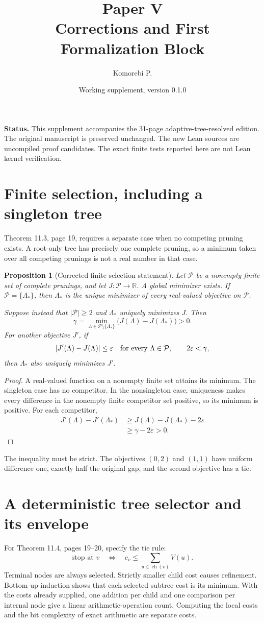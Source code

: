 \documentclass[11pt]{article}
\title{Paper V\\Corrections and First Formalization Block}
\author{Komorebi P.}
\date{Working supplement, version 0.1.0}
\newtheorem{proposition}{Proposition}
\newcommand{\R}{\mathbb R}
\begin{document}
\maketitle
\noindent\textbf{Status.} This supplement accompanies the 31-page adaptive-tree-resolved edition. The original manuscript is preserved unchanged. The new Lean sources are uncompiled proof candidates. The exact finite tests reported here are not Lean kernel verification.

\section{Finite selection, including a singleton tree}
Theorem 11.3, page 19, requires a separate case when no competing pruning exists. A root-only tree has precisely one complete pruning, so a minimum taken over all competing prunings is not a real number in that case.

\begin{proposition}[Corrected finite selection statement]
Let $\mathcal P$ be a nonempty finite set of complete prunings, and let $J:\mathcal P\to\R$. A global minimizer exists. If $\mathcal P=\{\Lambda_*\}$, then $\Lambda_*$ is the unique minimizer of every real-valued objective on $\mathcal P$.

Suppose instead that $|\mathcal P|\ge2$ and $\Lambda_*$ uniquely minimizes $J$. Then
\[
\gamma=\min_{\Lambda\in\mathcal P\setminus\{\Lambda_*\}}
\bigl(J(\Lambda)-J(\Lambda_*)\bigr)>0.
\]
For another objective $J'$, if
\[
|J'(\Lambda)-J(\Lambda)|\le\varepsilon
\quad\hbox{for every }\Lambda\in\mathcal P,
\qquad 2\varepsilon<\gamma,
\]
then $\Lambda_*$ also uniquely minimizes $J'$.
\end{proposition}
\begin{proof}
A real-valued function on a nonempty finite set attains its minimum. The singleton case has no competitor. In the nonsingleton case, uniqueness makes every difference in the nonempty finite competitor set positive, so its minimum is positive. For each competitor,
\begin{align*}
J'(\Lambda)-J'(\Lambda_*)
&\ge J(\Lambda)-J(\Lambda_*)-2\varepsilon\\
&\ge\gamma-2\varepsilon>0.
\end{align*}
\end{proof}
The inequality must be strict. The objectives $(0,2)$ and $(1,1)$ have uniform difference one, exactly half the original gap, and the second objective has a tie.

\section{A deterministic tree selector and its envelope}
For Theorem 11.4, pages 19--20, specify the tie rule:
\[
\text{stop at }v\quad\Longleftrightarrow\quad
c_v\le\sum_{u\in\operatorname{ch}(v)}V(u).
\]
Terminal nodes are always selected. Strictly smaller child cost causes refinement. Bottom-up induction shows that each selected subtree cost is its minimum. With the costs already supplied, one addition per child and one comparison per internal node give a linear arithmetic-operation count. Computing the local costs and the bit complexity of exact arithmetic are separate costs.
\end{document}
